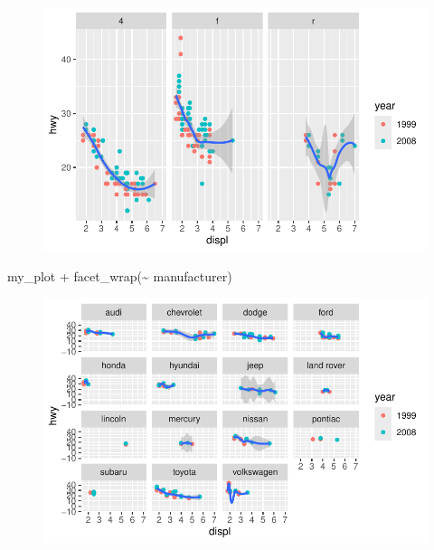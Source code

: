 \documentclass[
  letterpaper,
  DIV=11,
  numbers=noendperiod]{scrartcl}
\newenvironment{Shaded}{\begin{snugshade}}{\end{snugshade}}
\newcommand{\FunctionTok}[1]{\textcolor[rgb]{0.28,0.35,0.67}{#1}}
\newcommand{\NormalTok}[1]{\textcolor[rgb]{0.00,0.23,0.31}{#1}}
\newcommand{\SpecialCharTok}[1]{\textcolor[rgb]{0.37,0.37,0.37}{#1}}
\begin{document}
\begin{figure}[H]

{\centering \includegraphics{Part1_Lecture1_Ex_files/figure-pdf/unnamed-chunk-32-2.pdf}

}

\end{figure}

\begin{Shaded}
\begin{Highlighting}[]
\NormalTok{my\_plot }\SpecialCharTok{+} \FunctionTok{facet\_wrap}\NormalTok{(}\SpecialCharTok{\textasciitilde{}}\NormalTok{ manufacturer)}
\end{Highlighting}
\end{Shaded}

\begin{figure}[H]

{\centering \includegraphics{Part1_Lecture1_Ex_files/figure-pdf/unnamed-chunk-32-3.pdf}

}

\end{figure}
\end{document}
